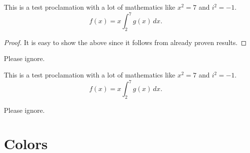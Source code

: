 \documentclass{TMarticle}
\begin{document}
\begin{theorem}[Euclid]
   This is a test proclamation with a lot of mathematics like $x^2 = 7$ and $i^2 = -1$.
   \[
       f(x) = x \int_2^7 g(x) \, dx.
   \]
\end{theorem}
\begin{proof}
   It is easy to show the above since it follows from already proven results.
\end{proof}
\begin{lemma}[TestLemma]
    Please ignore.
\end{lemma}
\begin{proposition}[Euclid]
   This is a test proclamation with a lot of mathematics like $x^2 = 7$ and $i^2 = -1$.
   \[
       f(x) = x \int_2^7 g(x) \, dx.
   \]
\end{proposition}
\begin{corollary}[Euclid 2]
    Please ignore.
\end{corollary}
\section{Colors}
\end{document}
